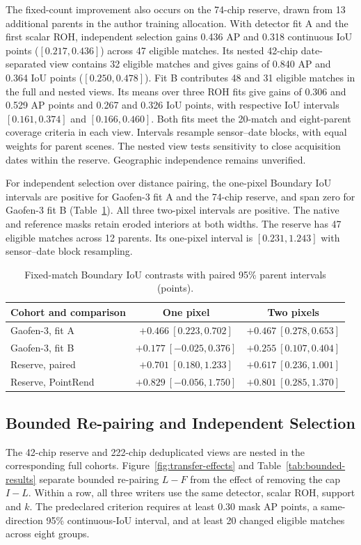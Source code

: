 \documentclass[journal]{IEEEtran}
\begin{document}
The fixed-count improvement also occurs on the 74-chip reserve, drawn from 13 additional parents in the author training allocation. With detector fit A and the first scalar ROH, independent selection gains 0.436 AP and 0.318 continuous IoU points (\([0.217,0.436]\)) across 47 eligible matches. Its nested 42-chip date-separated view contains 32 eligible matches and gives gains of 0.840 AP and 0.364 IoU points (\([0.250,0.478]\)). Fit B contributes 48 and 31 eligible matches in the full and nested views. Its means over three ROH fits give gains of 0.306 and 0.529 AP points and 0.267 and 0.326 IoU points, with respective IoU intervals \([0.161,0.374]\) and \([0.166,0.460]\). Both fits meet the 20-match and eight-parent coverage criteria in each view. Intervals resample sensor--date blocks, with equal weights for parent scenes. The nested view tests sensitivity to close acquisition dates within the reserve. Geographic independence remains unverified.

For independent selection over distance pairing, the one-pixel Boundary IoU intervals are positive for Gaofen-3 fit A and the 74-chip reserve, and span zero for Gaofen-3 fit B (Table~\ref{tab:native-boundary}). All three two-pixel intervals are positive. The native and reference masks retain eroded interiors at both widths. The reserve has 47 eligible matches across 12 parents. Its one-pixel interval is \([0.231,1.243]\) with sensor--date block resampling.

\begin{table}[t]
\centering
\caption{Fixed-match Boundary IoU contrasts with paired 95\% parent intervals (points).}
\label{tab:native-boundary}
\footnotesize
\setlength{\tabcolsep}{2.5pt}
\begin{tabular}{@{}lcc@{}}
\toprule
Cohort and comparison & One pixel & Two pixels\\
\midrule
Gaofen-3, fit A & \(+0.466\ [0.223,0.702]\) & \(+0.467\ [0.278,0.653]\)\\
Gaofen-3, fit B & \(+0.177\ [-0.025,0.376]\) & \(+0.255\ [0.107,0.404]\)\\
Reserve, paired & \(+0.701\ [0.180,1.233]\) & \(+0.617\ [0.236,1.001]\)\\
Reserve, PointRend & \(+0.829\ [-0.056,1.750]\) & \(+0.801\ [0.285,1.370]\)\\
\bottomrule
\end{tabular}
\end{table}

\subsection{Bounded Re-pairing and Independent Selection}
\label{sec:pairing-effects}
The 42-chip reserve and 222-chip deduplicated views are nested in the corresponding full cohorts. Figure~\ref{fig:transfer-effects} and Table~\ref{tab:bounded-results} separate bounded re-pairing \(L-F\) from the effect of removing the cap \(I-L\). Within a row, all three writers use the same detector, scalar ROH, support and \(k\). The predeclared criterion requires at least 0.30 mask AP points, a same-direction 95\% continuous-IoU interval, and at least 20 changed eligible matches across eight groups.
\end{document}
